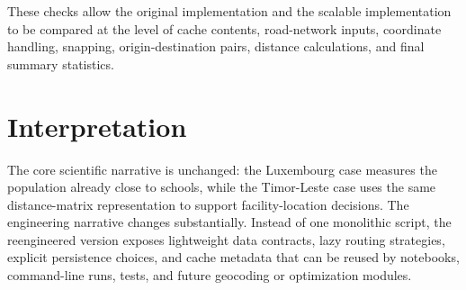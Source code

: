 \documentclass[11pt]{article}
\begin{document}
These checks allow the original implementation and the scalable implementation
to be compared at the level of cache contents, road-network inputs, coordinate
handling, snapping, origin-destination pairs, distance calculations, and final
summary statistics.

\section{Interpretation}

The core scientific narrative is unchanged: the Luxembourg case measures the
population already close to schools, while the Timor-Leste case uses the same
distance-matrix representation to support facility-location decisions.  The
engineering narrative changes substantially.  Instead of one monolithic script,
the reengineered version exposes lightweight data contracts, lazy routing
strategies, explicit persistence choices, and cache metadata that can be reused
by notebooks, command-line runs, tests, and future geocoding or optimization
modules.
\end{document}
